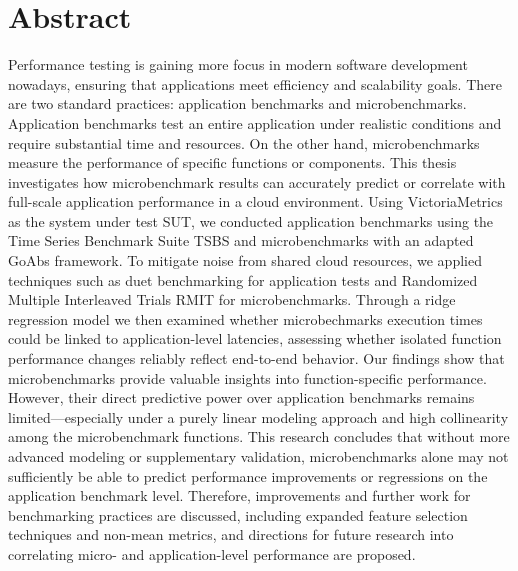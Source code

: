 \documentclass[a4paper, 11pt]{article}
\begin{document}


\newpage

\section*{Abstract}

Performance testing is gaining more focus in modern software development nowadays, ensuring that applications meet efficiency and scalability goals. There are two standard practices: application benchmarks and microbenchmarks. Application benchmarks test an entire application under realistic conditions and require substantial time and resources. On the other hand, microbenchmarks measure the performance of specific functions or components. This thesis investigates how microbenchmark results can accurately predict or correlate with full-scale application performance in a cloud environment.
Using VictoriaMetrics as the system under test \ac{SUT}, we conducted application benchmarks using the Time Series Benchmark Suite \ac{TSBS} and microbenchmarks with an adapted \ac{GoAbs} framework. To mitigate noise from shared cloud resources, we applied techniques such as duet benchmarking for application tests and Randomized Multiple Interleaved Trials \ac{RMIT} for microbenchmarks. Through a ridge regression model we then examined whether microbechmarks execution times could be linked to application-level latencies, assessing whether isolated function performance changes reliably reflect end-to-end behavior. Our findings show that microbenchmarks provide valuable insights into function-specific performance. However, their direct predictive power over application benchmarks remains limited—especially under a purely linear modeling approach and high collinearity among the microbenchmark functions. This research concludes that without more advanced modeling or supplementary validation, microbenchmarks alone may not sufficiently be able to predict performance improvements or regressions on the application benchmark level. Therefore, improvements and further work for benchmarking practices are discussed, including expanded feature selection techniques and non-mean metrics, and directions for future research into correlating micro- and application-level performance are proposed.
\end{document}
